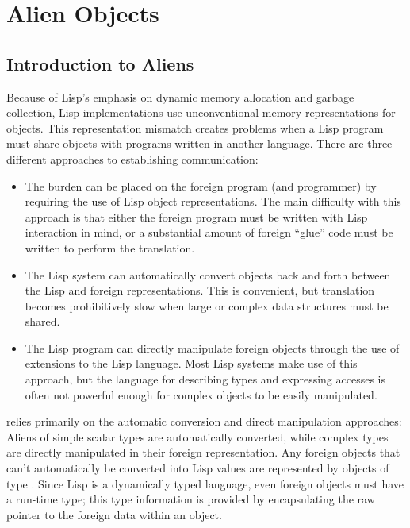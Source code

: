 \chapter{Alien Objects}
\label{aliens}



\section{Introduction to Aliens}

Because of Lisp's emphasis on dynamic memory allocation and garbage
collection, Lisp implementations use unconventional memory representations
for objects.  This representation mismatch creates problems when a Lisp
program must share objects with programs written in another language.  There
are three different approaches to establishing communication:

\begin{itemize}
\item The burden can be placed on the foreign program (and programmer) by
requiring the use of Lisp object representations.  The main difficulty with
this approach is that either the foreign program must be written with Lisp
interaction in mind, or a substantial amount of foreign ``glue'' code must be
written to perform the translation.

\item The Lisp system can automatically convert objects back and forth
between the Lisp and foreign representations.  This is convenient, but
translation becomes prohibitively slow when large or complex data structures
must be shared.

\item The Lisp program can directly manipulate foreign objects through the
use of extensions to the Lisp language.  Most Lisp systems make use of
this approach, but the language for describing types and expressing
accesses is often not powerful enough for complex objects to be easily
manipulated.
\end{itemize}

\cmucl{} relies primarily on the automatic conversion and direct manipulation
approaches: Aliens of simple scalar types are automatically converted,
while complex types are directly manipulated in their foreign
representation.  Any foreign objects that can't automatically be
converted into Lisp values are represented by objects of type
.  Since Lisp is a dynamically typed language, even
foreign objects must have a run-time type; this type information is
provided by encapsulating the raw pointer to the foreign data within an
 object.

